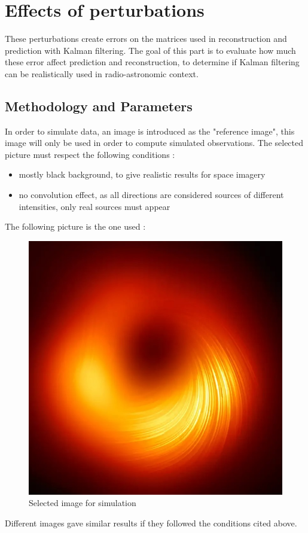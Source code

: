 \documentclass[titlepage]{article}
\begin{document}
	\section{Effects of perturbations}
	
	These perturbations create errors on the matrices used in reconstruction and prediction with Kalman filtering. The goal of this part is to evaluate how much these error affect prediction and reconstruction, to determine if Kalman filtering can be realistically used in radio-astronomic context. \\
	
	\subsection{Methodology and Parameters}

	In order to simulate data, an image is introduced as the "reference image", this image will only be used in order to compute simulated observations. The selected picture must respect the following conditions :
	\begin{itemize}
		\item mostly black background, to give realistic results for space imagery
		\item no convolution effect, as all directions are considered sources of different intensities, only real sources must appear
	\end{itemize}
	The following picture is the one used :
	
	\begin{figure}[H]
		\centering
		\includegraphics[width=0.5\linewidth]{src/bh_square}
		\caption{Selected image for simulation}
		\label{fig:bhsquare}
	\end{figure}
	
	Different images gave similar results if they followed the conditions cited above.\\
\end{document}
